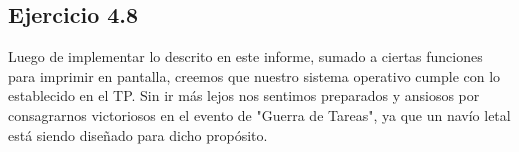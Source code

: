 \bigskip
\bigskip
\bigskip
\bigskip
\bigskip
\subsection{Ejercicio 4.8}
\par{
Luego de implementar lo descrito en este informe, sumado a ciertas funciones para imprimir en pantalla, creemos que nuestro sistema operativo cumple con lo establecido en el TP. Sin ir más lejos nos sentimos preparados y ansiosos por consagrarnos victoriosos en el evento de "Guerra de Tareas", ya que un navío letal está siendo diseñado para dicho propósito.}